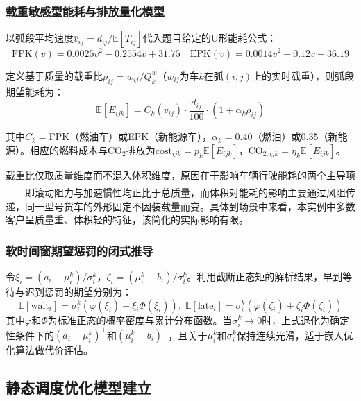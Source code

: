 \documentclass[12pt,a4paper]{article}
\newcommand{\upcite}[1]{\textsuperscript{\textsuperscript{\cite{#1}}}}
\begin{document}
\subsubsection{载重敏感型能耗与排放量化模型}

以弧段平均速度$\bar v_{ij}=d_{ij}/\mathbb{E}[\tilde T_{ij}]$代入题目给定的U形能耗公式：
\begin{equation}
\text{FPK}(\bar v)=0.0025\bar v^2-0.2554\bar v+31.75\quad
\text{EPK}(\bar v)=0.0014\bar v^2-0.12\bar v+36.19
\end{equation}

定义基于质量的载重比$\rho_{ij}=w_{ij}/Q_k^w$（$w_{ij}$为车$k$在弧$(i,j)$上的实时载重），则弧段期望能耗为：
\begin{equation}
\mathbb{E}[E_{ijk}]=C_k(\bar v_{ij})\cdot\frac{d_{ij}}{100}\cdot(1+\alpha_k\rho_{ij})
\end{equation}

其中$C_k=$FPK（燃油车）或EPK（新能源车），$\alpha_k=0.40$（燃油）或$0.35$（新能源）。相应的燃料成本与CO$_2$排放为$\text{cost}_{ijk}=p_k\mathbb{E}[E_{ijk}]$，$\text{CO}_{2,ijk}=\eta_k\mathbb{E}[E_{ijk}]$。

载重比仅取质量维度而不混入体积维度，原因在于影响车辆行驶能耗的两个主导项——即滚动阻力与加速惯性均正比于总质量\upcite{bektas2011}，而体积对能耗的影响主要通过风阻传递，同一型号货车的外形固定不因装载量而变。具体到场景中来看，本实例中多数客户呈质量重、体积轻的特征，该简化的实际影响有限。

\subsubsection{软时间窗期望惩罚的闭式推导}

令$\xi_i=(a_i-\mu_i^k)/\sigma_i^k$，$\zeta_i=(\mu_i^k-b_i)/\sigma_i^k$。利用截断正态矩的解析结果，早到等待与迟到惩罚的期望分别为：
\begin{equation}
\mathbb{E}[\text{wait}_i]=\sigma_i^k\left(\varphi(\xi_i)+\xi_i\Phi(\xi_i)\right),\;
\mathbb{E}[\text{late}_i]=\sigma_i^k\left(\varphi(\zeta_i)+\zeta_i\Phi(\zeta_i)\right)
\end{equation}
其中$\varphi$和$\Phi$为标准正态的概率密度与累计分布函数。当$\sigma_i^k\to 0$时，上式退化为确定性条件下的$(a_i-\mu_i^k)^+$和$(\mu_i^k-b_i)^+$，且关于$\mu_i^k$和$\sigma_i^k$保持连续光滑，适于嵌入优化算法做代价评估。

\subsection{静态调度优化模型建立}
\end{document}
